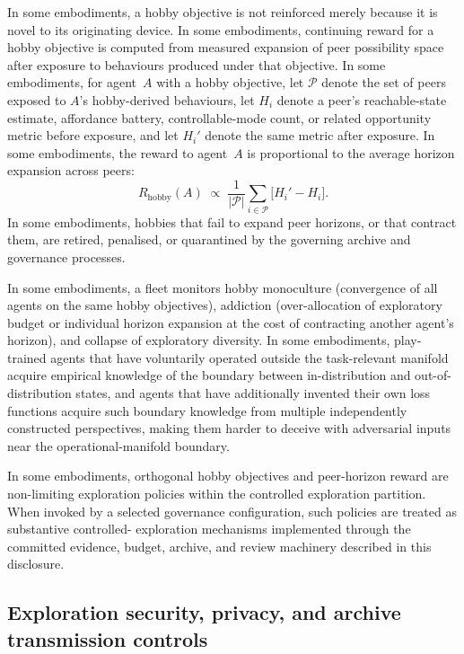 \documentclass[a4paper,12pt]{article}
\begin{document}
In some embodiments, a hobby objective is not reinforced merely because
it is novel to its originating device. In some embodiments, continuing
reward for a hobby objective is computed from measured expansion of
peer possibility space after exposure to behaviours produced under
that objective. In some embodiments, for agent~$A$ with a hobby
objective, let $\mathcal{P}$ denote the set of peers exposed to $A$'s
hobby-derived behaviours, let $H_i$ denote a peer's reachable-state
estimate, affordance battery, controllable-mode count, or related
opportunity metric before exposure, and let $H_i'$ denote the same
metric after exposure. In some embodiments, the reward to agent~$A$
is proportional to the average horizon expansion across peers:
\[
  R_{\mathrm{hobby}}(A) \;\propto\;
  \frac{1}{|\mathcal{P}|} \sum_{i \in \mathcal{P}}
  \bigl[H_i' - H_i\bigr].
\]
In some
embodiments, hobbies that fail to expand peer horizons, or that
contract them, are retired, penalised, or quarantined by the
governing archive and governance processes.

In some embodiments, a fleet monitors hobby monoculture (convergence
of all agents on the same hobby objectives), addiction
(over-allocation of exploratory budget or individual horizon expansion
at the cost of contracting another agent's horizon), and collapse of
exploratory diversity. In some embodiments, play-trained agents that
have voluntarily operated outside the task-relevant manifold acquire
empirical knowledge of the boundary between in-distribution and
out-of-distribution states, and agents that have additionally invented
their own loss functions acquire such boundary knowledge from multiple
independently constructed perspectives, making them harder to deceive
with adversarial inputs near the operational-manifold boundary.

In some embodiments, orthogonal hobby objectives and peer-horizon
reward are non-limiting exploration policies within the controlled
exploration partition. When invoked by a selected governance
configuration, such policies are treated as substantive controlled-
exploration mechanisms implemented through the committed evidence,
budget, archive, and review machinery described in this disclosure.

\subsection{Exploration security, privacy, and archive transmission
  controls}
\end{document}
